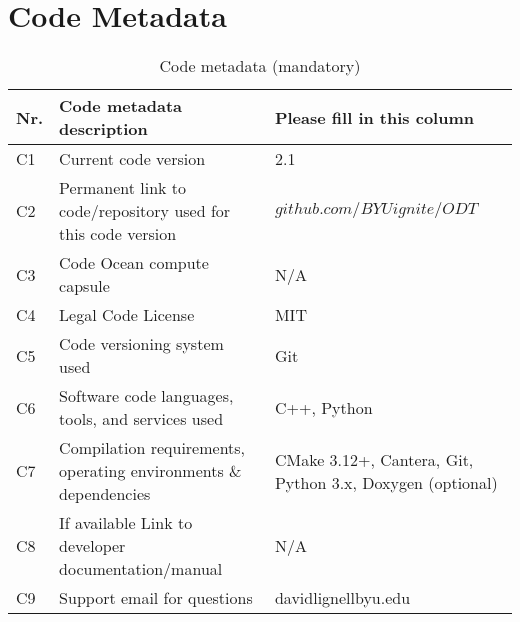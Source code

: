 \documentclass[preprint,12pt, a4paper]{elsarticle}
\begin{document}
\section*{Code Metadata}
\label{metadata}

\begin{table}[H]
\begin{tabular}{|l|p{6.5cm}|p{6.5cm}|}
\hline
\textbf{Nr.} & \textbf{Code metadata description} & \textbf{Please fill in this column} \\
\hline
C1 & Current code version & 2.1 \\
\hline
C2 & Permanent link to code/repository used for this code version & $github.com/BYUignite/ODT$ \\
\hline
C3 & Code Ocean compute capsule & N/A\\
\hline
C4 & Legal Code License   & MIT \\
\hline
C5 & Code versioning system used & Git \\
\hline
C6 & Software code languages, tools, and services used & C++, Python \\
\hline
C7 & Compilation requirements, operating environments \& dependencies & CMake 3.12+, Cantera, Git, Python 3.x, Doxygen (optional) \\
\hline
C8 & If available Link to developer documentation/manual & N/A \\
\hline
C9 & Support email for questions & davidlignellbyu.edu \\
\hline
\end{tabular}
\caption{Code metadata (mandatory)}
\end{table}


\linenumbers


\end{document}
